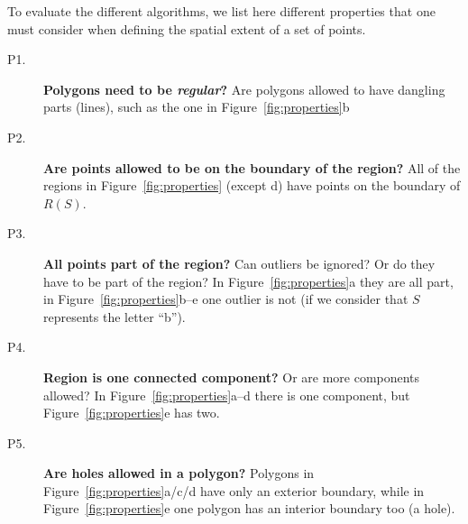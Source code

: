 To evaluate the different algorithms, we list here different properties that one must consider when defining the spatial extent of a set of points.
\begin{description}
  \item[P1.] \textbf{Polygons need to be \emph{regular}?} Are polygons allowed to have dangling parts (lines), such as the one in Figure~\ref{fig:properties}b
  \item[P2.] \textbf{Are points allowed to be on the boundary of the region?} All of the regions in Figure~\ref{fig:properties} (except d) have points on the boundary of $R(S)$.
  \item[P3.] \textbf{All points part of the region?} Can outliers be ignored? Or do they have to be part of the region? In Figure~\ref{fig:properties}a they are all part, in Figure~\ref{fig:properties}b--e one outlier is not (if we consider that $S$ represents the letter ``b'').
  \item[P4.] \textbf{Region is one connected component?} Or are more components allowed? In Figure~\ref{fig:properties}a--d there is one component, but Figure~\ref{fig:properties}e has two.
  \item[P5.] \textbf{Are holes allowed in a polygon?} Polygons in Figure~\ref{fig:properties}a/c/d have only an exterior boundary, while in Figure~\ref{fig:properties}e one polygon has an interior boundary too (a hole).
\end{description}
